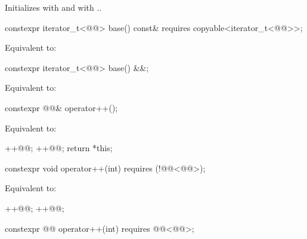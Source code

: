 \documentclass{wg21}
\begin{document}
\begin{itemdescr}
    \pnum
    \effects
    Initializes  with  and  with ..
\end{itemdescr}

\begin{itemdecl}
    constexpr iterator_t<@@> base() const&
    requires copyable<iterator_t<@@>>;
\end{itemdecl}

\begin{itemdescr}
    \pnum
    \effects
    Equivalent to: 
\end{itemdescr}

\begin{itemdecl}
    constexpr iterator_t<@@> base() &&;
\end{itemdecl}

\begin{itemdescr}
    \pnum
    \effects
    Equivalent to: 
\end{itemdescr}

\begin{itemdecl}
    constexpr @@& operator++();
\end{itemdecl}

\begin{itemdescr}
    \pnum
    \effects
    Equivalent to:
    \begin{codeblock}
        ++@@;
        ++@@;
        return *this;
    \end{codeblock}
\end{itemdescr}

\begin{itemdecl}
    constexpr void operator++(int) requires (!@@<@@>);
\end{itemdecl}

\begin{itemdescr}
    \pnum
    \effects
    Equivalent to:
    \begin{codeblock}
        ++@@;
        ++@@;
    \end{codeblock}
\end{itemdescr}

\begin{itemdecl}
    constexpr @@ operator++(int) requires @@<@@>;
\end{itemdecl}
\end{document}
